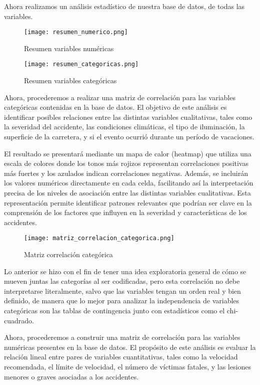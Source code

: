 \documentclass{book}
\begin{document}
Ahora realizamos un análisis estadístico de nuestra base de datos, de todas las variables.

\begin{figure}[h]
\centering
\texttt{[image: resumen\_numerico.png]}
\caption{\label{fig:resumen variables numericas}Resumen variables numéricas}
\end{figure}

\begin{figure}[htbp]
\centering
\texttt{[image: resumen\_categoricas.png]}
\caption{\label{fig:resumen variables categoricas}Resumen variables categóricas}
\end{figure}

Ahora, procederemos a realizar una matriz de correlación para las variables categóricas contenidas en la base de datos. El objetivo de este análisis es identificar posibles relaciones entre las distintas variables cualitativas, tales como la severidad del accidente, las condiciones climáticas, el tipo de iluminación, la superficie de la carretera, y si el evento ocurrió durante un período de vacaciones.

El resultado se presentará mediante un mapa de calor (heatmap) que utiliza una escala de colores donde los tonos más rojizos representan correlaciones positivas más fuertes y los azulados indican correlaciones negativas. Además, se incluirán los valores numéricos directamente en cada celda, facilitando así la interpretación precisa de los niveles de asociación entre las distintas variables cualitativas. Esta representación permite identificar patrones relevantes que podrían ser clave en la comprensión de los factores que influyen en la severidad y características de los accidentes.

\begin{figure}[htbp]
\centering
\texttt{[image: matriz\_correlacion\_categorica.png]}
\caption{\label{fig:matriz correlacion categorica}Matriz correlación categórica}
\end{figure}

Lo anterior se hizo con el fin de tener una idea exploratoria general de cómo se mueven juntas las categorías al ser codificadas, pero esta correlación no debe interpretarse literalmente, salvo que las variables tengan un orden real y bien definido, de manera que lo mejor para analizar la independencia de variables categóricas son las tablas de contingencia junto con estadísticos como el chi-cuadrado.

Ahora, procederemos a construir una matriz de correlación para las variables numéricas presentes en la base de datos. El propósito de este análisis es evaluar la relación lineal entre pares de variables cuantitativas, tales como la velocidad recomendada, el límite de velocidad, el número de víctimas fatales, y las lesiones menores o graves asociadas a los accidentes.
\end{document}
